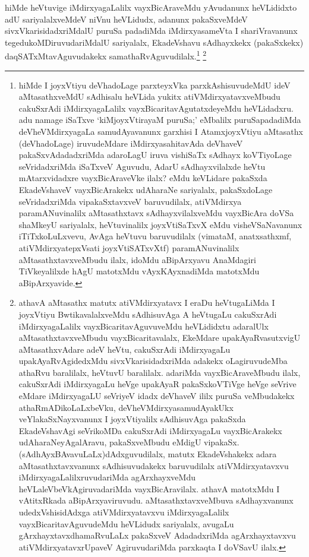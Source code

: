 \begin{artha}
hiMde heVtuvige iMdirxyagaLalilx vayxBicAraveMdu yAvudanunx heVLididxto adU sariyalalxveMdeV niVnu heVLidudx, adanunx pakaSxveMdeV sivxVkarisidadxriMdalU puruSa padadiMda iMdirxyasameVta I shariVravanunx tegedukoMDiruvudariMdalU sariyalalx, EkadeVshavu sAdhayxkekx (pakaSxkekx) daqSATxMtavAguvudakekx samathaRvAguvudilalx.\footnote{hiMde I joyxVtiyu deVhadoLage parxteyxVka parxkAshisuvudeMdU ideV aMtasathxveMdU sAdhisalu heVLida yukitx atiVMdirxyatavxveMbudu cakuSxrAdi iMdirxyagaLalilx vayxBicaritavAgutatxdeyeMdu heVLidadxru. adu namage iSaTxve `kiMjoyxVtirayaM puruSa;' eMbalilx puruSapadadiMda deVheVMdirxyagaLa samudAyavanunx garxhisi I AtamxjoyxVtiyu aMtasathx (deVhadoLage) iruvudeMdare iMdirxyasahitavAda deVhaveV pakaSxvAdadadxriMda adaroLagU iruva vishiSaTx sAdhayx koVTiyoLage seVridadxriMda iSaTxveV Aguvudu, AdarU sAdhayxvilalxde heVtu mAtarxvidadxre vayxBicAraveVke ilalx? eMdu keVLidare pakaSxda EkadeVshaveV vayxBicArakekx udAharaNe sariyalalx, pakaSxdoLage seVridadxriMda vipakaSxtavxveV baruvudilalx, atiVMdirxya paramANuvinalilx aMtasathxtavx sAdhayxvilalxveMdu vayxBicAra doVSa shaMkeyU sariyalalx, heVtuvinalilx joyxVtiSaTxvX eMdu visheVSaNavanunx iTiTxkoLuLxvevu, AvAga heVtuvu baruvudilalx (vimataM, anatxsathxmf, atiVMdirxyatepxVsati joyxVtiSATxvXtf) paramANuvinalilx aMtasathxtavxveMbudu ilalx, idoMdu aBipArxyavu AnaMdagiri TiVkeyalilxde hAgU matotxMdu vAyxKAyxnadiMda matotxMdu aBipArxyavide.} 
\footnote{athavA aMtasathx matutx atiVMdirxyatavx I eraDu heVtugaLiMda I joyxVtiyu BwtikavalalxveMdu sAdhisuvAga A heVtugaLu cakuSxrAdi iMdirxyagaLalilx vayxBicaritavAguvuveMdu heVLididxtu adaralUlx aMtasathxtavxveMbudu vayxBicaritavalalx, EkeMdare upakAyaRvasutxvigU aMtasathxvAdare adeV heVtu, cakuSxrAdi iMdirxyagaLu upakAyaRvAgidedxMdu sivxVkarisidadxriMda adakekx oLagiruvudeMba athaRvu baralilalx, heVtuvU baralilalx. adariMda vayxBicAraveMbudu ilalx, cakuSxrAdi iMdirxyagaLu heVge upakAyaR pakaSxkoVTiVge heVge seVrive eMdare iMdirxyagaLU seVriyeV idadx deVhaveV ililx puruSa veMbudakekx athaRmADikoLaLxbeVku, deVheVMdirxyasamudAyakUkx veYlakaSxNayxvanunx I joyxVtiyalilx sAdhisuvAga pakaSxda EkadeVshavAgi seVrikoMDa cakuSxrAdi iMdirxyagaLu vayxBicArakekx udAharaNeyAgalAravu, pakaSxveMbudu eMdigU vipakaSx. (sAdhAyxBAvavuLaLx)dAdxguvudilalx, matutx EkadeVshakekx adara aMtasathxtavxvanunx sAdhisuvudakekx baruvudilalx atiVMdirxyatavxvu iMdirxyagaLalilxruvudariMda agArxhayxveMdu heVLaleVbeVkAgiruvadariMda vayxBicAravilalx. athavA matotxMdu I vAtitxRkada aBipArxyaviruvudu. aMtasathxtavxveMbuva sAdhayxvanunx udedxVshisidAdxga atiVMdirxyatavxvu iMdirxyagaLalilx vayxBicaritavAguvudeMdu heVLidudx sariyalalx, avugaLu gArxhayxtavxdhamaRvuLaLx pakaSxveV AdadadxriMda agArxhayxtavxvu atiVMdirxyatavxrUpaveV AgiruvudariMda parxkaqta I doVSavU ilalx.}

\end{artha}

